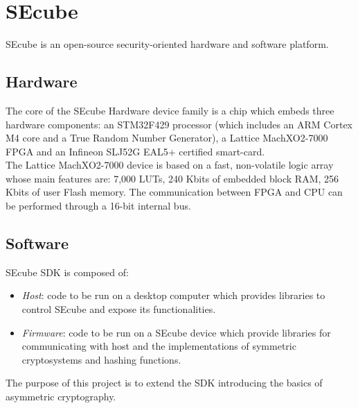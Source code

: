 \section{SEcube\textsuperscript{\texttrademark}}
SEcube\textsuperscript{\texttrademark} is an open-source security-oriented
hardware and software platform.

\subsection{Hardware}
The core of the SEcube\textsuperscript{\texttrademark} Hardware device family
is a chip which embeds three hardware components: an STM32F429 processor (which
includes an ARM Cortex M4 core and a True Random Number Generator), a Lattice
MachXO2-7000 FPGA and an Infineon SLJ52G EAL5+ certified smart-card.\\ The
Lattice MachXO2-7000 device is based on a fast, non-volatile logic array whose
main features are: 7,000 LUTs, 240 Kbits of embedded block RAM, 256 Kbits of
user Flash memory.  The communication between FPGA and CPU can be performed
through a 16-bit internal bus.

\subsection{Software}
SEcube\textsuperscript{\texttrademark} SDK is composed of:
\begin{itemize}
	\item \emph{Host}: code to be run on a desktop computer which provides
		libraries to control SEcube and expose its functionalities.
	\item \emph{Firmware}: code to be run on a SEcube device which provide
		libraries for communicating with host and the implementations of
		symmetric cryptosystems and hashing functions.
\end{itemize}
The purpose of this project is to extend the SDK introducing the basics of
asymmetric cryptography.

